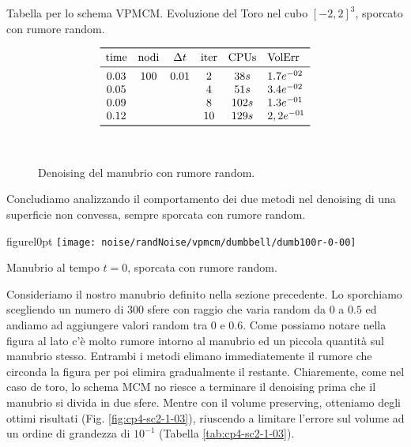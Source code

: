 \begin{table}[htb!]
\caption{Tabella per lo schema VPMCM. Evoluzione del Toro nel cubo
  $[-2,2]^3$, sporcato con rumore random.}
\label{tab:cp4-sc2-1-02}
\[
\begin{array}{*{5}{c}l}
    \toprule
    \text{time} &\text{nodi} &\Delta t &\text{iter} &\text{CPUs}&\text{VolErr} \\
    \midrule
     0.03       & 100        & 0.01    & 2          & 38s      &1.7e^{-02}\\
     0.05       &            &         & 4          & 51s      &3.4e^{-02}\\ 
     0.09       &            &         & 8          & 102s     &1.3e^{-01}\\ 
     0.12       &            &         & 10         & 129s     &2,2e^{-01}\\
     \bottomrule
\end{array}
\]
\end{table}

\begin{figure}[htb!]
  \centering
  \quad
  \\
  \quad
  \quad
  \caption{Denoising del manubrio con rumore random.}
  \label{fig:cp4-sc2-1-02}
\end{figure}
\newpage

Concludiamo analizzando il comportamento dei due metodi nel denoising
di una superficie non convessa, sempre sporcata con rumore random.

\begin{wrapfloat}{figure}{l}{0pt}
\texttt{[image: noise/randNoise/vpmcm/dumbbell/dumb100r-0-00]}
\caption{Manubrio al tempo $t=0$, sporcata con rumore random.}
\end{wrapfloat}

Consideriamo il nostro manubrio definito nella sezione
precedente. Lo sporchiamo scegliendo un numero di $300$ sfere con
raggio che varia random  da $0$ a $0.5$ ed andiamo ad aggiungere
 valori random tra $0$ e $0.6$. Come possiamo notare nella figura al
 lato c'è molto rumore intorno al manubrio ed un piccola quantità sul
 manubrio stesso. Entrambi i metodi elimano immediatemente il rumore
 che circonda la figura per poi elimira gradualmente il
 restante. Chiaremente, come nel caso de toro, lo schema MCM no
 riesce a terminare il denoising prima che il manubrio si divida in
 due sfere. Mentre con il volume preserving, otteniamo degli ottimi
 risultati (Fig. \ref{fig:cp4-sc2-1-03}), riuscendo a limitare
 l'errore sul volume ad un ordine di grandezza di $10^{-1}$
 (Tabella \ref{tab:cp4-sc2-1-03}). 


